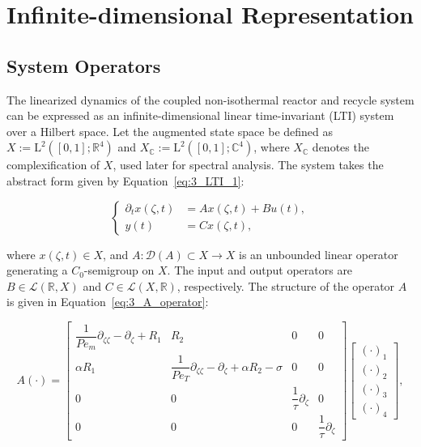 \section{Infinite-dimensional Representation} \label{sec:3_3_LTI}

\subsection{System Operators}

The linearized dynamics of the coupled non-isothermal reactor and recycle system can be expressed as an infinite-dimensional linear time-invariant (LTI) system over a Hilbert space. Let the augmented state space be defined as $X := \mathrm{L}^2([0,1]; \mathbb{R}^4)$ and $X_\mathbb{C} := \mathrm{L}^2([0,1]; \mathbb{C}^4)$, where $X_\mathbb{C}$ denotes the complexification of $X$, used later for spectral analysis. The system takes the abstract form given by Equation~\eqref{eq:3_LTI_1}:

\begin{equation} \label{eq:3_LTI_1}
\begin{cases}
\partial_t x(\zeta, t) &= A x(\zeta, t) + B u(t), \\
y(t) &= C x(\zeta, t),
\end{cases}
\end{equation}

where $x(\zeta, t) \in X$, and $A : \mathcal{D}(A) \subset X \to X$ is an unbounded linear operator generating a $C_0$-semigroup on $X$. The input and output operators are $B \in \mathcal{L}(\mathbb{R}, X)$ and $C \in \mathcal{L}(X, \mathbb{R})$, respectively. The structure of the operator $A$ is given in Equation~\eqref{eq:3_A_operator}:

\begin{equation} \label{eq:3_A_operator}
A (\cdot) =
\begin{bmatrix} 
\dfrac{1}{Pe_m} \partial_{\zeta\zeta} - \partial_\zeta + R_1 & R_2 & 0 & 0 \\
\alpha R_1 & \dfrac{1}{Pe_T} \partial_{\zeta\zeta} - \partial_\zeta + \alpha R_2 - \sigma & 0 & 0 \\
0 & 0 & \dfrac{1}{\tau} \partial_\zeta & 0 \\
0 & 0 & 0 & \dfrac{1}{\tau} \partial_\zeta
\end{bmatrix} \begin{bmatrix} (\cdot)_1 \\ (\cdot)_2 \\ (\cdot)_3 \\ (\cdot)_4 \end{bmatrix},
\end{equation}

